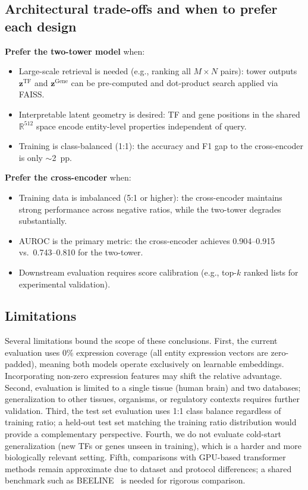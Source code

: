 \documentclass[10pt,twocolumn]{article}
\begin{document}
\subsection{Architectural trade-offs and when to prefer each design}

\textbf{Prefer the two-tower model} when:
\begin{itemize}
    \item Large-scale retrieval is needed (e.g., ranking all $M \times N$ pairs):
    tower outputs $\mathbf{z}^{\text{TF}}$ and $\mathbf{z}^{\text{Gene}}$ can
    be pre-computed and dot-product search applied via FAISS.
    \item Interpretable latent geometry is desired: TF and gene positions in
    the shared $\mathbb{R}^{512}$ space encode entity-level properties
    independent of query.
    \item Training is class-balanced (1:1): the accuracy and F1 gap to the
    cross-encoder is only $\sim$2~pp.
\end{itemize}

\textbf{Prefer the cross-encoder} when:
\begin{itemize}
    \item Training data is imbalanced (5:1 or higher): the cross-encoder
    maintains strong performance across negative ratios, while the two-tower
    degrades substantially.
    \item AUROC is the primary metric: the cross-encoder achieves 0.904--0.915
    vs.\ 0.743--0.810 for the two-tower.
    \item Downstream evaluation requires score calibration (e.g., top-$k$
    ranked lists for experimental validation).
\end{itemize}

\subsection{Limitations}
\label{sec:limitations}

Several limitations bound the scope of these conclusions.
First, the current evaluation uses 0\% expression coverage (all entity expression
vectors are zero-padded), meaning both models operate exclusively on learnable
embeddings.
Incorporating non-zero expression features may shift the relative advantage.
Second, evaluation is limited to a single tissue (human brain) and two
databases; generalization to other tissues, organisms, or regulatory contexts
requires further validation.
Third, the test set evaluation uses 1:1 class balance regardless of training
ratio; a held-out test set matching the training ratio distribution would provide
a complementary perspective.
Fourth, we do not evaluate cold-start generalization (new TFs or genes unseen
in training), which is a harder and more biologically relevant setting.
Fifth, comparisons with GPU-based transformer methods remain approximate due to
dataset and protocol differences; a shared benchmark such as
BEELINE~\cite{pratapa2020benchmarking} is needed for rigorous comparison.
\end{document}

